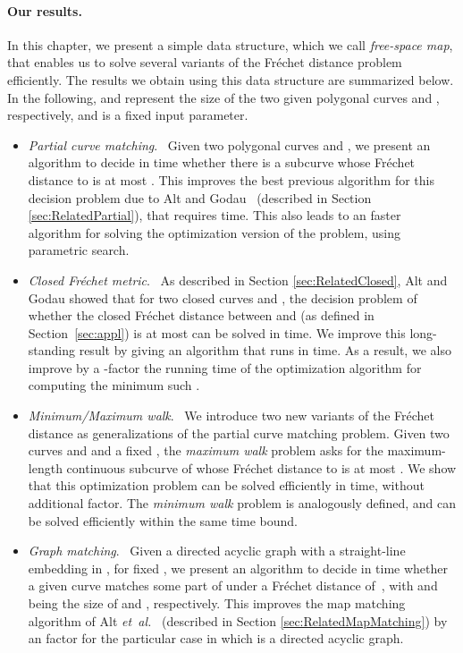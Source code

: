 \documentclass[12pt]{dalthesis}
\newcommand{\etal}{{\em et~al.\/}}
\newcommand{\Frechet}{Fr\'echet }
\newcommand{\fs}{free-space }
\begin{document}
\paragraph{\bf Our results.\ }
In this chapter, we present a simple data structure, which we call \emph{\fs map},
that enables us to solve several variants of the \Frechet distance problem efficiently.
The results we obtain using this data structure are summarized below.
In the following,  and  represent the size of 
the two given polygonal curves  and , respectively, 
and  is a fixed input parameter.

\begin{itemize}\setlength{\itemsep}{.3em}
\renewcommand{\labelitemi}{}

	\item \emph{Partial curve matching}. \ 
	Given two polygonal curves  and , 
	we present an algorithm to decide in  time whether
	there is a subcurve  whose \Frechet distance to  is at most .
	This improves the best previous algorithm for this decision problem 
	due to Alt and Godau~\cite{AltG95}
	(described in Section \ref{sec:RelatedPartial}),
	that requires  time.
	This also leads to an  faster algorithm for solving
	the optimization version of the problem, using parametric search.
	
	\item \emph{Closed \Frechet metric}. \ 
	As described in Section \ref{sec:RelatedClosed},	
	Alt and Godau showed that 
	for two closed curves  and , 	
	the decision problem of whether the closed \Frechet distance between 
	and  (as defined in Section~\ref{sec:appl})
	is at most  can be solved in  time. 
	We improve this long-standing result by giving an algorithm that runs in  time.
	As a result, we also improve by a -factor 
	the running time of the optimization algorithm for computing the minimum such .

	\item \emph{Minimum/Maximum walk}. \ 
	We introduce two new variants of the \Frechet distance
	as generalizations of the partial curve matching problem.
	Given two curves  and  and a fixed , 
	the \emph{maximum walk} problem asks for the
	maximum-length continuous subcurve of  whose \Frechet distance to  is at most .
	We show that this optimization problem can be solved efficiently in  time,
	without additional  factor.
	The \emph{minimum walk} problem is analogously defined, and can be solved efficiently
	within the same time bound.

	\item \emph{Graph matching}. \ 
	Given a directed acyclic graph  with a straight-line embedding in ,
	for fixed ,
	we present an algorithm to decide in  time whether
	a given curve  matches some part of 
	 under a \Frechet distance of~, 
	with  and  being the size of  and , respectively.
	This improves the map matching algorithm of Alt \etal~\cite{AltERW03a}
	(described in Section \ref{sec:RelatedMapMatching})
	by an  factor for the particular case in which  is a directed acyclic graph.
	 


\end{itemize}
\end{document}
